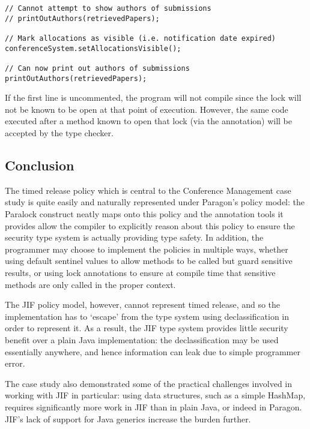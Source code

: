 \begin{verbatim}
// Cannot attempt to show authors of submissions
// printOutAuthors(retrievedPapers);

// Mark allocations as visible (i.e. notification date expired)
conferenceSystem.setAllocationsVisible();

// Can now print out authors of submissions
printOutAuthors(retrievedPapers);
\end{verbatim}

If the first  line is uncommented, the program will not compile since the lock will not be known to be open at that point of execution. However, the same code executed after a method known to open that lock (via the  annotation) will be accepted by the type checker.

\subsection{Conclusion}

The timed release policy which is central to the Conference Management case study is quite easily and naturally represented under Paragon's policy model: the Paralock construct neatly maps onto this policy and the annotation tools it provides allow the compiler to explicitly reason about this policy to ensure the security type system is actually providing type safety. In addition, the programmer may choose to implement the policies in multiple ways, whether using default sentinel values to allow methods to be called but guard sensitive results, or using lock annotations to ensure at compile time that sensitive methods are only called in the proper context.

The JIF policy model, however, cannot represent timed release, and so the implementation has to `escape' from the type system using declassification in order to represent it. As a result, the JIF type system provides little security benefit over a plain Java implementation: the declassification may be used essentially anywhere, and hence information can leak due to simple programmer error.

The case study also demonstrated some of the practical challenges involved in working with JIF in particular: using data structures, such as a simple HashMap, requires significantly more work in JIF than in plain Java, or indeed in Paragon. JIF's lack of support for Java generics increase the burden further.